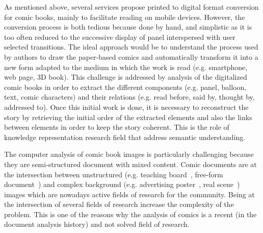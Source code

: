 	
	
	

As mentioned above, several services propose printed to digital format conversion for comic books, mainly to facilitate reading on mobile devices.
However, the conversion process is both tedious because done by hand, and simplistic as it is too often reduced to the successive display of panel interspersed with user selected transitions.
The ideal approach would be to understand the process used by authors to draw the paper-based comics and automatically transform it into a new form adapted to the medium in which the work is read (e.g. smartphone, web page, 3D book). 
This challenge is addressed by analysis of the digitalized comic books in order to extract the different components (e.g. panel, balloon, text, comic characters) and their relations (e.g. read before, said by, thought by, addressed to).
Once this initial work is done, it is necessary to reconstruct the story by retrieving the initial order of the extracted elements and also the links between elements in order to keep the story coherent.
This is the role of knowledge representation research field that address semantic understanding.%



The computer analysis of comic book images is particularly challenging because they are semi-structured document with mixed content.
Comic documents are at the intersection between unstructured (e.g. teaching board~\cite{Oliveira10}, free-form document~\cite{Delaye2014Multi}) and complex background (e.g. advertising poster~\cite{Clavelli09}, real scene~\cite{Weinman09,Epshtein10,Neumann12}) images which are nowadays active fields of research for the community.
Being at the intersection of several fields of research increase the complexity of the problem.
This is one of the reasons why the analysis of comics is a recent (in the document analysis history) and not solved field of research.



